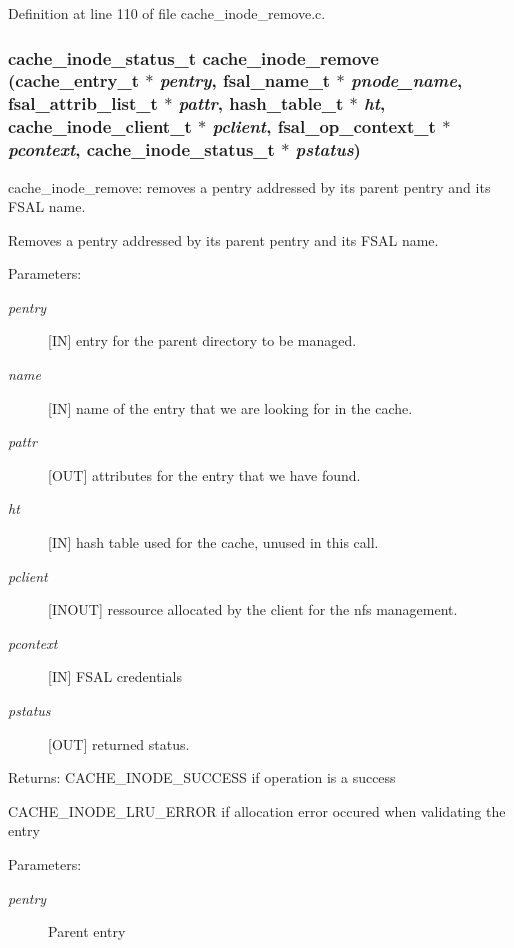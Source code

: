 Definition at line 110 of file cache\_\-inode\_\-remove.c.
\subsubsection[{cache\_\-inode\_\-remove}]{\setlength{\rightskip}{0pt plus 5cm}cache\_\-inode\_\-status\_\-t cache\_\-inode\_\-remove (cache\_\-entry\_\-t $\ast$ {\em pentry}, \/  fsal\_\-name\_\-t $\ast$ {\em pnode\_\-name}, \/  fsal\_\-attrib\_\-list\_\-t $\ast$ {\em pattr}, \/  hash\_\-table\_\-t $\ast$ {\em ht}, \/  cache\_\-inode\_\-client\_\-t $\ast$ {\em pclient}, \/  fsal\_\-op\_\-context\_\-t $\ast$ {\em pcontext}, \/  cache\_\-inode\_\-status\_\-t $\ast$ {\em pstatus})}\label{cache__inode__remove_8c_1ebe1ccf9bc7daf2f75aa7bf78522e22}


cache\_\-inode\_\-remove: removes a pentry addressed by its parent pentry and its FSAL name.

Removes a pentry addressed by its parent pentry and its FSAL name.

\begin{Desc}
\item[Parameters:]
\begin{description}
\item[{\em pentry}][IN] entry for the parent directory to be managed. \item[{\em name}][IN] name of the entry that we are looking for in the cache. \item[{\em pattr}][OUT] attributes for the entry that we have found. \item[{\em ht}][IN] hash table used for the cache, unused in this call. \item[{\em pclient}][INOUT] ressource allocated by the client for the nfs management. \item[{\em pcontext}][IN] FSAL credentials \item[{\em pstatus}][OUT] returned status.\end{description}
\end{Desc}
\begin{Desc}
\item[Returns:]CACHE\_\-INODE\_\-SUCCESS if operation is a success \par
 

CACHE\_\-INODE\_\-LRU\_\-ERROR if allocation error occured when validating the entry \end{Desc}
\begin{Desc}
\item[Parameters: ]\par
\begin{description}
\item[{\em 
pentry}]Parent entry \end{description}
\end{Desc}


